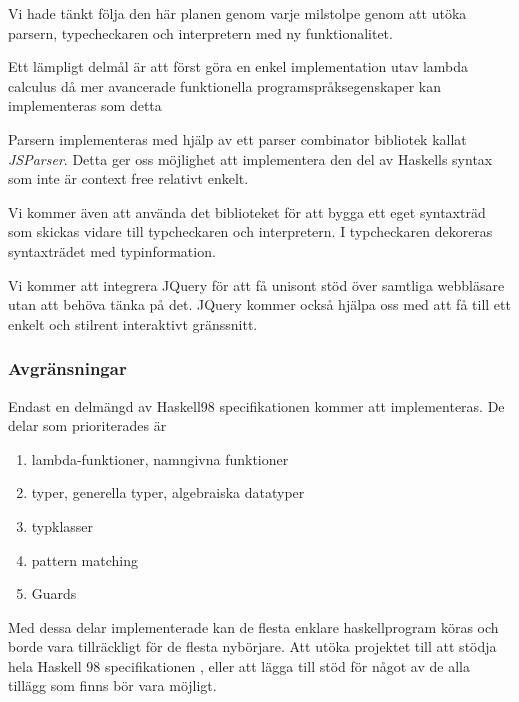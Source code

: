 Vi hade tänkt följa den här planen genom varje milstolpe genom att utöka parsern, typecheckaren och interpretern med ny funktionalitet.

Ett lämpligt delmål är att först göra en enkel implementation utav lambda calculus då mer avancerade funktionella programspråksegenskaper kan implementeras som detta \citep{jones87}

 Parsern implementeras med hjälp av ett parser combinator bibliotek kallat \emph{JSParser}. Detta ger oss möjlighet att implementera den del av Haskells syntax som inte är context free relativt enkelt.

Vi kommer även att använda det biblioteket för att bygga ett eget syntaxträd som skickas vidare till typcheckaren och interpretern. I typcheckaren dekoreras syntaxträdet med typinformation.

Vi kommer att integrera JQuery för att få unisont stöd över samtliga webbläsare utan att behöva tänka på det. JQuery kommer också hjälpa oss med att få till ett enkelt och stilrent interaktivt gränssnitt.

\subsubsection{Avgränsningar}
Endast en delmängd av Haskell98 specifikationen kommer att implementeras. De delar som prioriterades är
        \begin{enumerate}
            \item{lambda-funktioner, namngivna funktioner}
            \item{typer, generella typer, algebraiska datatyper}
            \item{typklasser}
            \item{pattern matching}
            \item{Guards}
            \end{enumerate}
Med dessa delar implementerade kan de flesta enklare haskellprogram köras och borde vara tillräckligt för de flesta nybörjare. Att utöka projektet till att stödja hela Haskell 98 specifikationen \citep{haskell98}, eller att lägga till stöd för något av de alla tillägg som finns bör vara möjligt.
